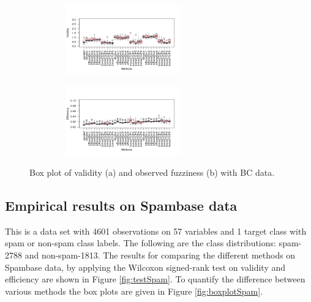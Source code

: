 \documentclass[main]{subfiles}
\begin{document}
\begin{figure}[h]
\centering
\begin{subfigure}{.5\textwidth}
  \centering
  \includegraphics[width=6cm,height=3cm]{images/boxplotBC}
\end{subfigure}%
\begin{subfigure}{.5\textwidth}
  \centering
  \includegraphics[width=6cm,height=3cm]{images/boxplotBC_eff}
\end{subfigure}%
\caption{\small Box plot of validity (a) and observed fuzziness (b) with BC data.} \label{fig:boxplotBC}
\end{figure}

\subsection{Empirical results on Spambase data}
This is a data set with 4601 observations on 57 variables and 1 target class with spam or non-spam class labels. The following are the class distributions: spam-2788 and non-spam-1813.
The results for comparing the different methods on Spambase data, by applying the Wilcoxon signed-rank test on validity and efficiency are shown in Figure \ref{fig:testSpam}. To quantify the difference between various methods the box plots are given in Figure \ref{fig:boxplotSpam}.
\end{document}
